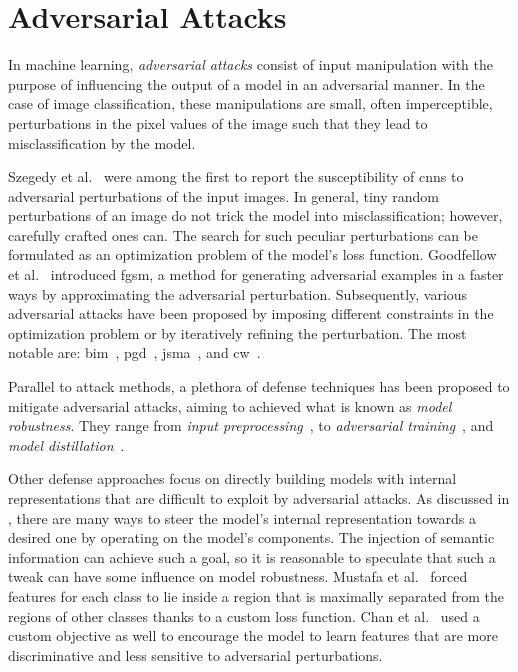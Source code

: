 \section{Adversarial Attacks}
\label{sec:adversarial-attacks-related-work}

In machine learning, \emph{adversarial attacks} consist of input manipulation with the purpose of influencing the output of a model in an adversarial manner.
In the case of image classification, these manipulations are small, often imperceptible, perturbations in the pixel values of the image such that they lead to misclassification by the model.

Szegedy et al.~\cite{IntriguingPropSzeged2013} were among the first to report the susceptibility of \acrshort{cnn}s to adversarial perturbations of the input images. In general, tiny random perturbations of an image do not trick the model into misclassification; however, carefully crafted ones can. The search for such peculiar perturbations can be formulated as an optimization problem of the model's loss function.
Goodfellow et al.~\cite{ExplainingAndGoodfe2014} introduced \acrfull{fgsm}, a method for generating adversarial examples in a faster ways by approximating the adversarial perturbation.
Subsequently, various adversarial attacks have been proposed by imposing different constraints in the optimization problem or by iteratively refining the perturbation. The most notable are: \acrfull{bim}~\cite{AdversarialExaKuraki2016}, \acrfull{pgd}~\cite{TowardsDeepLeMadry2017}, \acrfull{jsma}~\cite{MaximalJacobiaWiyatn2018}, and \acrfull{cw}~\cite{TowardsEvaluatCarlin2016}.

Parallel to attack methods, a plethora of defense techniques has been proposed to mitigate adversarial attacks, aiming to achieved what is known as \emph{model robustness}. They range from \emph{input preprocessing}~\cite{FeatureSqueeziXuWe2017, CounteringAdveGuoC2017, AStudyOfTheDziuga2016, DefenseAgainstLiao2017}, to \emph{adversarial training}~\cite{ExplainingAndGoodfe2014, TowardsDeepLeMadry2017, EnsembleAdversTramer2017, AdversarialMacKuraki2016}, and \emph{model distillation}~\cite{DistillationAsPapern2015, TheLimitationsPapern2015, DefensiveDistiCarlin2016, AdversariallyRGoldbl2019}.

Other defense approaches focus on directly building models with internal representations that are difficult to exploit by adversarial attacks. As discussed in , there are many ways to steer the model's internal representation towards a desired one by operating on the model's components. The injection of semantic information can achieve such a goal, so it is reasonable to speculate that such a tweak can have some influence on model robustness. Mustafa et al.~\cite{AdversarialDefMustaf2019} forced features for each class to lie inside a region that is maximally separated from the regions of other classes thanks to a custom loss function. Chan et al.~\cite{ImprovingAdverChen2019} used a custom objective as well to encourage the model to learn features that are more discriminative and less sensitive to adversarial perturbations.
